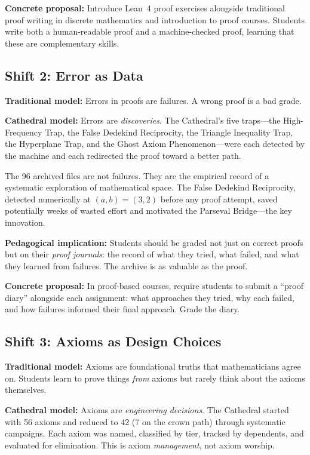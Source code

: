 \documentclass[11pt,a4paper]{article}
\begin{document}
\textbf{Concrete proposal:} Introduce Lean~4 proof exercises alongside
traditional proof writing in discrete mathematics and introduction
to proof courses. Students write both a human-readable proof and a
machine-checked proof, learning that these are complementary skills.

\subsection{Shift 2: Error as Data}

\textbf{Traditional model:} Errors in proofs are failures. A wrong
proof is a bad grade.

\textbf{Cathedral model:} Errors are \emph{discoveries}. The
Cathedral's five traps---the High-Frequency Trap, the False Dedekind
Reciprocity, the Triangle Inequality Trap, the Hyperplane Trap, and
the Ghost Axiom Phenomenon---were each detected by the machine and
each redirected the proof toward a better path.

The 96 archived files are not failures. They are the empirical record
of a systematic exploration of mathematical space. The False Dedekind
Reciprocity, detected numerically at $(a,b) = (3,2)$ before any proof
attempt, saved potentially weeks of wasted effort and motivated the
Parseval Bridge---the key innovation.

\textbf{Pedagogical implication:} Students should be graded not just
on correct proofs but on their \emph{proof journals}: the record of
what they tried, what failed, and what they learned from failures.
The archive is as valuable as the proof.

\textbf{Concrete proposal:} In proof-based courses, require students
to submit a ``proof diary'' alongside each assignment: what approaches
they tried, why each failed, and how failures informed their
final approach. Grade the diary.

\subsection{Shift 3: Axioms as Design Choices}

\textbf{Traditional model:} Axioms are foundational truths that
mathematicians agree on. Students learn to prove things \emph{from}
axioms but rarely think about the axioms themselves.

\textbf{Cathedral model:} Axioms are \emph{engineering decisions}.
The Cathedral started with 56 axioms and reduced to 42 (7 on the
crown path) through systematic campaigns. Each axiom was named,
classified by tier, tracked by dependents, and evaluated for
elimination. This is axiom \emph{management}, not axiom worship.
\end{document}
